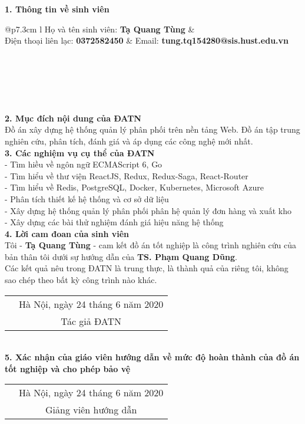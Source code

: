 \cleardoublepage

\begin{dedication}
\textbf{1. Thông tin về sinh viên} \\
\begin{tabular}{@{}p{7.3cm} l}
Họ và tên sinh viên: \textbf{Tạ Quang Tùng} & \\ 
Điện thoại liên lạc: \textbf{0372582450} &  Email: \textbf{tung.tq154280@sis.hust.edu.vn} \\
 \\
 \\
 \\
\\
\end{tabular}\\
\textbf{2. Mục đích nội dung của ĐATN}\\
Đồ án xây dựng hệ thống quản lý phân phối trên nền tảng Web. Đồ án
tập trung nghiên cứu, phân tích, đánh giá và áp dụng các công nghệ
mới nhất. \\
\textbf{3. Các nghiệm vụ cụ thể của ĐATN}\\
- Tìm hiều về ngôn ngữ ECMAScript 6, Go \\
- Tìm hiểu về thư viện ReactJS, Redux, Redux-Saga, React-Router \\
- Tìm hiểu về Redis, PostgreSQL, Docker, Kubernetes, Microsoft Azure \\
- Phân tích thiết kế hệ thống và cơ sở dữ liệu \\
- Xây dựng hệ thống quản lý phân phối phân hệ quản lý đơn hàng và xuất kho \\
- Xây dựng các bài thử nghiệm đánh giá hiệu năng hệ thống \\
\textbf{4. Lời cam đoan của sinh viên} \\
Tôi - \textbf{Tạ Quang Tùng} - cam kết đồ án tốt nghiệp
là công trình nghiên
cứu của bản thân tôi dưới sự hướng dẫn của \textbf{TS. Phạm Quang Dũng}. \\
Các kết quả nêu trong ĐATN là trung thực, là thành quả của
riêng tôi, không sao chép theo bất kỳ công trình nào khác. \\
\begin{tabu} {  m{7cm} c }
 & Hà Nội, ngày 24 tháng 6 năm 2020\\
 & Tác giả ĐATN
\end{tabu} \\[2.5cm]
\textbf{5. Xác nhận của giáo viên hướng dẫn về mức độ hoàn thành của đồ án
tốt nghiệp và cho phép bảo vệ} \\
\begin{tabu} {  m{7cm} c }
 & Hà Nội, ngày 24 tháng 6 năm 2020\\
 & Giảng viên hướng dẫn 
\end{tabu} \\[2.5cm]
\end{dedication}
